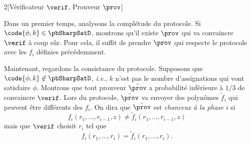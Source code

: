 \documentclass[./main]{subfiles}
\begin{document}
\begin{prv}
    \begin{algorithm}[H]
      \caption{Protocole interactif pour \pbSharpSatD}
      \begin{paralgo}{2}[Vérificateur $\verif$, Prouveur $\prov$]
        \EndIf[0]
        \EndIf[0]
        \EndIf[0]
      \end{paralgo}
    \end{algorithm}

    Dans un premier temps, analysons la complétude du protocole. Si
    $\code{\phi, k} \in \pbSharpSatD$, montrons qu'il existe $\prov$ qui va
    convaincre  $\verif$ à coup sûr. Pour cela, il suffit de prendre $\prov$
    qui respecte le protocole avec les $f_i$ définies précédemment.

    Maintenant, regardons la consistance du protocole. Supposons que
    $\code{\phi, k} \not\in \pbSharpSatD$, \textit{i.e.}, $k$ n'est pas le
    nombre d'assignations qui vont satisfaire $\phi$. Montrons que tout
    prouveur $\tilde{\prov}$ a probabilité inférieure à $1/3$ de convaincre
    $\verif$. Lors du protocole,  $\tilde{\prov}$ va envoyer des polynômes
    $\tilde{f}_i$ qui peuvent être différents des $f_i$. On dira que
    $\tilde{\prov}$ est \textit{chanceux à la phase $i$} si
    \[
    f_i(r_1, \ldots, r_{i-1}, z) \neq  \tilde f_i (r_1, \ldots, r_{i-1}, z)
    \] mais que $\verif$ choisit $r_i$ tel que \[
    f_i(r_1, \ldots, r_i) = \tilde f_i (r_1, \ldots, r_i)
    .\] 


\end{prv}
\end{document}
